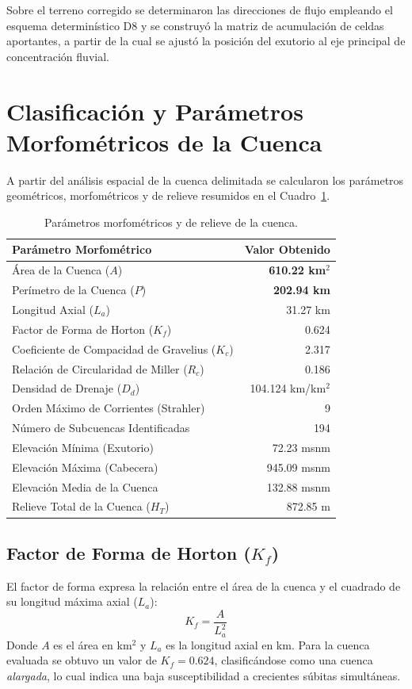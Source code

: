 \documentclass[11pt,a4paper]{article}
\begin{document}
Sobre el terreno corregido se determinaron las direcciones de flujo empleando el esquema determinístico D8 y se construyó la matriz de acumulación de celdas aportantes, a partir de la cual se ajustó la posición del exutorio al eje principal de concentración fluvial.

\section{Clasificación y Parámetros Morfométricos de la Cuenca}
A partir del análisis espacial de la cuenca delimitada se calcularon los parámetros geométricos, morfométricos y de relieve resumidos en el Cuadro~\ref{tab:morfometria}.

\begin{table}[H]
\centering
\caption{Parámetros morfométricos y de relieve de la cuenca.}
\label{tab:morfometria}
\begin{tabular}{p{8.5cm}r}\toprule
\textbf{Parámetro Morfométrico} & \textbf{Valor Obtenido} \\\midrule
Área de la Cuenca ($A$) & \textbf{610.22 km$^2$} \\
Perímetro de la Cuenca ($P$) & \textbf{202.94 km} \\
Longitud Axial ($L_a$) & 31.27 km \\
Factor de Forma de Horton ($K_f$) & 0.624 \\
Coeficiente de Compacidad de Gravelius ($K_c$) & 2.317 \\
Relación de Circularidad de Miller ($R_c$) & 0.186 \\
Densidad de Drenaje ($D_d$) & 104.124 km/km$^2$ \\
Orden Máximo de Corrientes (Strahler) & 9 \\
Número de Subcuencas Identificadas & 194 \\
Elevación Mínima (Exutorio) & 72.23 msnm \\
Elevación Máxima (Cabecera) & 945.09 msnm \\
Elevación Media de la Cuenca & 132.88 msnm \\
Relieve Total de la Cuenca ($H_T$) & 872.85 m \\
\bottomrule
\end{tabular}
\end{table}

\subsection*{Factor de Forma de Horton ($K_f$)}
El factor de forma expresa la relación entre el área de la cuenca y el cuadrado de su longitud máxima axial ($L_a$):
\begin{equation}
K_f = \frac{A}{L_a^2}
\end{equation}
Donde $A$ es el área en km$^2$ y $L_a$ es la longitud axial en km. Para la cuenca evaluada se obtuvo un valor de $K_f = 0.624$, clasificándose como una cuenca \textit{alargada}, lo cual indica una baja susceptibilidad a crecientes súbitas simultáneas.
\end{document}
